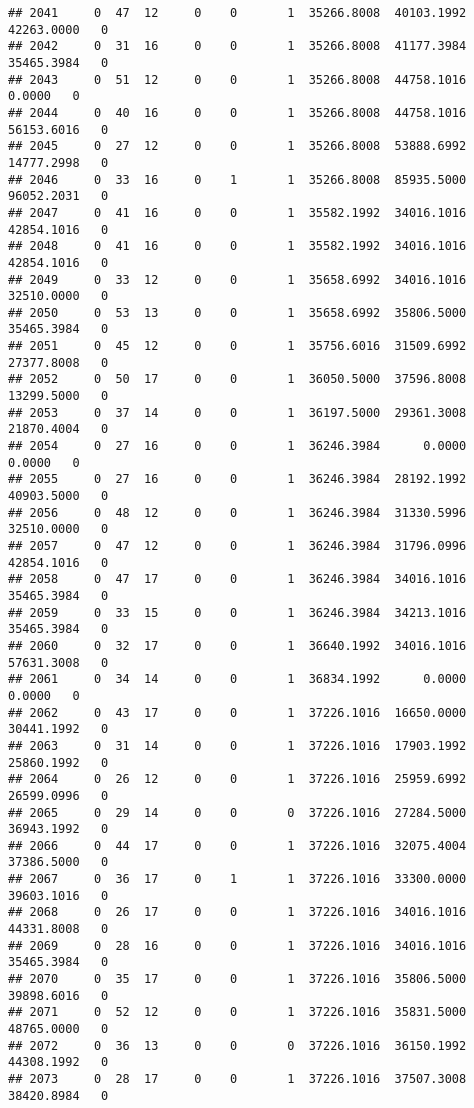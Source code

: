 \documentclass[
]{article}
\begin{document}
\begin{enumerate}
\begin{verbatim}
## 2041     0  47  12     0    0       1  35266.8008  40103.1992  42263.0000   0
## 2042     0  31  16     0    0       1  35266.8008  41177.3984  35465.3984   0
## 2043     0  51  12     0    0       1  35266.8008  44758.1016      0.0000   0
## 2044     0  40  16     0    0       1  35266.8008  44758.1016  56153.6016   0
## 2045     0  27  12     0    0       1  35266.8008  53888.6992  14777.2998   0
## 2046     0  33  16     0    1       1  35266.8008  85935.5000  96052.2031   0
## 2047     0  41  16     0    0       1  35582.1992  34016.1016  42854.1016   0
## 2048     0  41  16     0    0       1  35582.1992  34016.1016  42854.1016   0
## 2049     0  33  12     0    0       1  35658.6992  34016.1016  32510.0000   0
## 2050     0  53  13     0    0       1  35658.6992  35806.5000  35465.3984   0
## 2051     0  45  12     0    0       1  35756.6016  31509.6992  27377.8008   0
## 2052     0  50  17     0    0       1  36050.5000  37596.8008  13299.5000   0
## 2053     0  37  14     0    0       1  36197.5000  29361.3008  21870.4004   0
## 2054     0  27  16     0    0       1  36246.3984      0.0000      0.0000   0
## 2055     0  27  16     0    0       1  36246.3984  28192.1992  40903.5000   0
## 2056     0  48  12     0    0       1  36246.3984  31330.5996  32510.0000   0
## 2057     0  47  12     0    0       1  36246.3984  31796.0996  42854.1016   0
## 2058     0  47  17     0    0       1  36246.3984  34016.1016  35465.3984   0
## 2059     0  33  15     0    0       1  36246.3984  34213.1016  35465.3984   0
## 2060     0  32  17     0    0       1  36640.1992  34016.1016  57631.3008   0
## 2061     0  34  14     0    0       1  36834.1992      0.0000      0.0000   0
## 2062     0  43  17     0    0       1  37226.1016  16650.0000  30441.1992   0
## 2063     0  31  14     0    0       1  37226.1016  17903.1992  25860.1992   0
## 2064     0  26  12     0    0       1  37226.1016  25959.6992  26599.0996   0
## 2065     0  29  14     0    0       0  37226.1016  27284.5000  36943.1992   0
## 2066     0  44  17     0    0       1  37226.1016  32075.4004  37386.5000   0
## 2067     0  36  17     0    1       1  37226.1016  33300.0000  39603.1016   0
## 2068     0  26  17     0    0       1  37226.1016  34016.1016  44331.8008   0
## 2069     0  28  16     0    0       1  37226.1016  34016.1016  35465.3984   0
## 2070     0  35  17     0    0       1  37226.1016  35806.5000  39898.6016   0
## 2071     0  52  12     0    0       1  37226.1016  35831.5000  48765.0000   0
## 2072     0  36  13     0    0       0  37226.1016  36150.1992  44308.1992   0
## 2073     0  28  17     0    0       1  37226.1016  37507.3008  38420.8984   0

\end{verbatim}
\end{enumerate}
\end{document}
